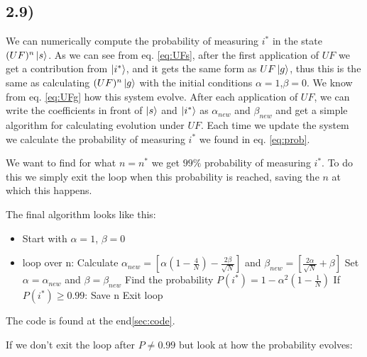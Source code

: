 \documentclass[a4paper,norsk, 10pt]{article}
\begin{document}
\subsection{2.9)}

We can numerically compute the probability of measuring $i^*$ in the state $(UF)^n\ket{s}$. As we can see from eq. \eqref{eq:UFs}, after the first application of $UF$ we get a contribution from $\ket{i^*}$, and it gets the same form as $UF\ket{g}$, thus this is the same as calculating $(UF)^n\ket{g}$ with the initial conditions $\alpha = 1$,$\beta = 0$. We know from eq. \ref{eq:UFg} how this system evolve. After each application of  $UF$, we can write the coefficients in front of $\ket{s}$ and $\ket{i^*}$ as $\alpha_{new}$ and $\beta_{new}$ and get a simple algorithm for calculating evolution under $UF$. Each time we update the system we calculate the probability of measuring $i^*$ we found in eq. \eqref{eq:prob}.

We want to find for what $n=n^*$ we get $99\%$ probability of measuring $i^*$. To do this we simply exit the loop when this probability is reached, saving the $n$ at which this happens.

The final algorithm looks like this:

\begin{itemize}
\label{item:algo}
\item Start with $\alpha = 1$, $\beta = 0$
\item loop over n:
\subitem Calculate $\alpha_{new} = \left[\alpha\left(1 - \frac{4}{N}\right) - \frac{2\beta}{\sqrt{N}}\right]$ and $\beta_{new} = \left[\frac{2\alpha}{\sqrt{N}} + \beta\right]$
\subitem Set $\alpha = \alpha_{new}$ and $\beta = \beta_{new}$
\subitem Find the probability $P(i^*) = 1 - \alpha^2\left(1 - \frac{1}{N}\right)$
\subitem If $P(i^*) \geq 0.99$:
\subsubitem Save n
\subsubitem Exit loop
\end{itemize}

The code is found at the end\ref{sec:code}.


If we don't exit the loop after $P \neq 0.99$ but look at how the probability evolves:
\end{document}

